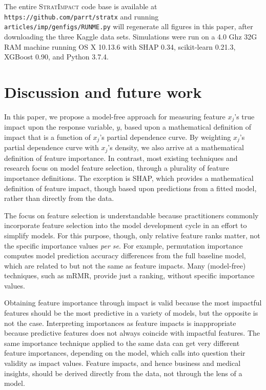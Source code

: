\documentclass[11pt]{article}
\newcommand{\simp}{\fontfamily{cmr}\textsc{\small StratImpact}}
\begin{document}
The entire \simp{} code base is available at {\tt\small https://github.com/parrt/stratx} and running {\tt\small articles/imp/genfigs/RUNME.py} will regenerate all figures in this paper, after downloading the three Kaggle data sets.  Simulations were run on a 4.0 Ghz 32G RAM machine running OS X 10.13.6 with SHAP 0.34, scikit-learn                       0.21.3, XGBoost 0.90, and Python 3.7.4.

\section{Discussion and future work}\label{sec:discussion}

In this paper, we propose a model-free approach for measuring feature $x_j$'s true impact upon the response variable, $y$, based upon a mathematical definition of impact that is a function of $x_j$'s partial dependence curve. By weighting $x_j$'s partial dependence curve with $x_j$'s density, we also arrive at a mathematical definition of feature importance.   In contrast, most existing techniques and research focus on model feature selection, through a plurality of feature importance definitions.   The exception is SHAP, which provides a mathematical definition of feature impact, though based upon predictions from a fitted model, rather than directly from the data.

The focus on feature selection is understandable because practitioners commonly incorporate feature selection into the model development cycle in an effort to simplify models. For this purpose, though, only relative feature ranks matter, not the specific importance values {\em per se}.  For example, permutation importance  computes model prediction accuracy differences from the full baseline model, which are related to but not the same as feature impacts. Many (model-free) techniques, such as mRMR, provide just a ranking, without specific importance values.

Obtaining feature importance through impact is valid because the most impactful features should be the most predictive in a variety of models, but the opposite is not the case.   Interpreting importances as feature impacts is inappropriate because predictive features does not always coincide with impactful features.  The same importance technique applied to the same data can get very different feature importances, depending on the model, which calls into question their validity as impact values.  Feature impacts, and hence business and medical insights, should be derived directly from the data, not through the lens of a model.
\end{document}
